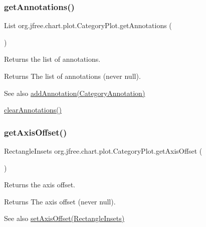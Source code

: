 \subsubsection{\texorpdfstring{get\+Annotations()}{getAnnotations()}}
{\footnotesize\ttfamily List org.\+jfree.\+chart.\+plot.\+Category\+Plot.\+get\+Annotations (\begin{DoxyParamCaption}{ }\end{DoxyParamCaption})}

Returns the list of annotations.

\begin{DoxyReturn}{Returns}
The list of annotations (never {\ttfamily null}).
\end{DoxyReturn}
\begin{DoxySeeAlso}{See also}
\mbox{\hyperlink{classorg_1_1jfree_1_1chart_1_1plot_1_1_category_plot_a2d0e34330e6184b16926794c8f43bf3d}{add\+Annotation(\+Category\+Annotation)}} 

\mbox{\hyperlink{classorg_1_1jfree_1_1chart_1_1plot_1_1_category_plot_af25bf2dbea35129a772698c95cd3d3c1}{clear\+Annotations()}} 
\end{DoxySeeAlso}
\mbox{\label{classorg_1_1jfree_1_1chart_1_1plot_1_1_category_plot_ad556bbd20fb3657e4ca0f9a58b2cc105}} 
\subsubsection{\texorpdfstring{get\+Axis\+Offset()}{getAxisOffset()}}
{\footnotesize\ttfamily Rectangle\+Insets org.\+jfree.\+chart.\+plot.\+Category\+Plot.\+get\+Axis\+Offset (\begin{DoxyParamCaption}{ }\end{DoxyParamCaption})}

Returns the axis offset.

\begin{DoxyReturn}{Returns}
The axis offset (never {\ttfamily null}).
\end{DoxyReturn}
\begin{DoxySeeAlso}{See also}
\mbox{\hyperlink{classorg_1_1jfree_1_1chart_1_1plot_1_1_category_plot_a2300f6317ee73cef6e46a90680af8d5a}{set\+Axis\+Offset(\+Rectangle\+Insets)}} 
\end{DoxySeeAlso}
\mbox{\label{classorg_1_1jfree_1_1chart_1_1plot_1_1_category_plot_aca7e5c323ac879cefd2816c7f3f3f994}} 
